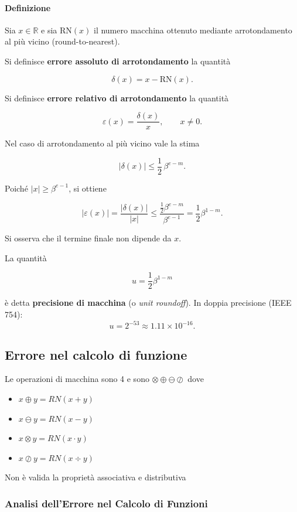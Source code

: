\documentclass[a4paper,12pt]{article}
\begin{document}
	\paragraph{Definizione}
	
	Sia $x \in \mathbb{R}$ e sia $\mathrm{RN}(x)$ il numero macchina ottenuto
	mediante arrotondamento al più vicino (round-to-nearest).
	
	\medskip
	
	Si definisce \textbf{errore assoluto di arrotondamento} la quantità
	
	\[
	\delta(x) = x - \mathrm{RN}(x).
	\]
	
	Si definisce \textbf{errore relativo di arrotondamento} la quantità
	
	\[
	\varepsilon(x) = \frac{\delta(x)}{x},
	\qquad x \neq 0.
	\]
	
	\medskip
	
	Nel caso di arrotondamento al più vicino vale la stima
	
	\[
	|\delta(x)| \le \frac{1}{2}\,\beta^{e-m}.
	\]
	
	Poiché $|x| \ge \beta^{e-1}$, si ottiene
	
	\[
	|\varepsilon(x)|
	= \frac{|\delta(x)|}{|x|}
	\le
	\frac{\frac{1}{2}\beta^{e-m}}{\beta^{e-1}}
	=
	\frac{1}{2}\beta^{1-m}.
	\]
	
	Si osserva che il termine finale non dipende da $x$.
	
	\medskip
	
	La quantità
	
	\[
	u = \frac{1}{2}\beta^{1-m}
	\]
	
	è detta \textbf{precisione di macchina} (o \emph{unit roundoff}).
	In doppia precisione (IEEE 754):
	\[
	u = 2^{-53} \approx 1.11 \times 10^{-16}.
	\]
	
	\subsection{Errore nel calcolo di funzione} 
	Le operazioni di macchina sono 4 e sono $\otimes \oplus \ominus \oslash$ dove
	\begin{itemize}
		\item $x \oplus y = RN(x+y)$
		\item $x \ominus y = RN(x-y)$
		\item $x \otimes y = RN(x \cdot y)$
		\item $x \oslash y = RN(x \div y)$
	\end{itemize} 
	Non è valida la proprietà associativa e distributiva
	\subsubsection{Analisi dell'Errore nel Calcolo di Funzioni}
	
\end{document}
